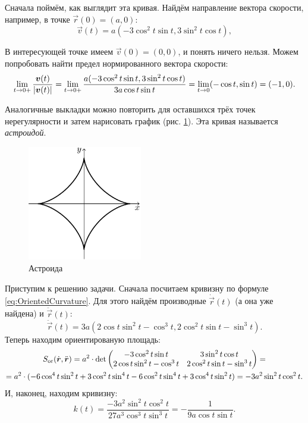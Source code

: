 \begin{solution}
	Сначала поймём, как выглядит эта кривая. Найдём направление вектора скорости, например, в точке $\vec{r}(0) = (a, 0)$:
	\[
		\vec{v}(t) = a(-3\cos^2t\sin t, 3\sin^2t\cos t),
	\]

	В интересующей точке имеем $\vec{v}(0) = (0, 0)$, и понять ничего нельзя. Можем попробовать найти предел нормированного вектора скорости:
	\[
		\lim_{t \to 0+}\frac{\boldsymbol{v}(t)}{\left\lvert\boldsymbol{v}(t)\right\rvert} = \lim_{t \to 0+}\frac{a(-3\cos^2t\sin t, 3\sin^2t\cos t)}{3a\cos t\sin t} = \lim_{t \to 0}(-\cos t, \sin t) = (-1, 0).
	\]

	Аналогичные выкладки можно повторить для оставшихся трёх точек нерегулярности и затем нарисовать график (рис. \ref{fig:Astroid}). Эта кривая называется \textit{астроидой}.

	\begin{figure}[h]
		\centering
		\includegraphics[width=5cm]{./img/Astroid.pdf}
		\caption{Астроида}
		\label{fig:Astroid}
	\end{figure}

	Приступим к решению задачи. Сначала посчитаем кривизну по формуле \eqref{eq:OrientedCurvature}. Для этого найдём производные $\dot{\vec{r}}(t)$ (а она уже найдена) и $\ddot{\vec{r}}(t)$:
	\[
		\ddot{\vec{r}}(t) = 3a(2\cos t\sin^2t - \cos^3t, 2\cos^2t\sin t - \sin^3t).
	\]
	Теперь находим ориентированую площадь:
	\begin{multline*}
		S_{\mathrm{or}}(\dot{\boldsymbol{r}}, \ddot{\boldsymbol{r}}) = a^2 \cdot \det
		\begin{pmatrix}
			-3\cos^2t\sin t & 3\sin^2t\cos t\\
			2\cos t\sin^2 t - \cos^3t & 2\cos^2t\sin t - \sin^3t
		\end{pmatrix} = \\ = a^2 \cdot (-6\cos^4t\sin^2t + 3\cos^2t\sin^4t - 6\cos^2t\sin^4t + 3\cos^4t\sin^2t) = -3a^2\sin^2t\cos^2t.
	\end{multline*}
	И, наконец, находим кривизну:
	\[
		k(t) = \frac{-3a^2\sin^2t\cos^2t}{27a^3\cos^3t\sin^3t} = -\frac{1}{9a\cos t\sin t}.
	\]


\end{solution}
